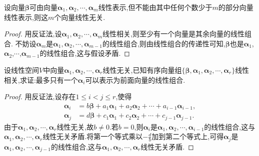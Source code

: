 \documentclass[../../main.tex]{subfiles}%
\begin{document}
\begin{proposition}\label{proposition:线性无关向量组的命题2}
设向量\(\boldsymbol{\beta}\)可由向量\(\boldsymbol{\alpha}_1,\boldsymbol{\alpha}_2,\cdots,\boldsymbol{\alpha}_m\)线性表示,但不能由其中任何个数少于\(m\)的部分向量线性表示,则这\(m\)个向量线性无关.
\end{proposition}
\begin{proof}

用反证法,设\(\boldsymbol{\alpha}_1,\boldsymbol{\alpha}_2,\cdots,\boldsymbol{\alpha}_m\)线性相关,则至少有一个向量是其余向量的线性组合. 不妨设\(\boldsymbol{\alpha}_m\)是\(\boldsymbol{\alpha}_1,\boldsymbol{\alpha}_2,\cdots,\boldsymbol{\alpha}_{m - 1}\)的线性组合,则由线性组合的传递性可知,\(\boldsymbol{\beta}\)也是$\boldsymbol{\alpha}_1$,$\boldsymbol{\alpha}_2$,$\cdots$,$\boldsymbol{\alpha}_{m - 1}$的线性组合,这与假设矛盾. 

\end{proof}

\begin{proposition}\label{proposition:线性无关向量组的命题3}
设线性空间\(V\)中向量\(\boldsymbol{\alpha}_1,\boldsymbol{\alpha}_2,\cdots,\boldsymbol{\alpha}_r\)线性无关,已知有序向量组\(\{\boldsymbol{\beta},\boldsymbol{\alpha}_1,\boldsymbol{\alpha}_2,\cdots,\boldsymbol{\alpha}_r\}\)线性相关,求证:最多只有一个\(\boldsymbol{\alpha}_i\)可以表示为前面向量的线性组合.
\end{proposition}
\begin{proof}

用反证法,设存在\(1\leqslant  i<j\leqslant  r\),使得
\begin{align*}
\boldsymbol{\alpha}_i&=b\boldsymbol{\beta}+a_1\boldsymbol{\alpha}_1 + a_2\boldsymbol{\alpha}_2+\cdots + a_{i - 1}\boldsymbol{\alpha}_{i - 1},\\
\boldsymbol{\alpha}_j&=d\boldsymbol{\beta}+c_1\boldsymbol{\alpha}_1 + c_2\boldsymbol{\alpha}_2+\cdots + c_{j - 1}\boldsymbol{\alpha}_{j - 1}.
\end{align*}
由于\(\boldsymbol{\alpha}_1,\boldsymbol{\alpha}_2,\cdots,\boldsymbol{\alpha}_r\)线性无关,故\(b\neq0\).若$b=0$,则\(\boldsymbol{\alpha}_i\)是\(\boldsymbol{\alpha}_1,\boldsymbol{\alpha}_2,\cdots,\boldsymbol{\alpha}_{i - 1}\)的线性组合,这与\(\boldsymbol{\alpha}_1,\boldsymbol{\alpha}_2,\cdots,\boldsymbol{\alpha}_r\)线性无关矛盾.将第一个等式乘以\(-\frac{d}{b}\)加到第二个等式上,可得\(\boldsymbol{\alpha}_j\)是\(\boldsymbol{\alpha}_1,\boldsymbol{\alpha}_2,\cdots,\boldsymbol{\alpha}_{j - 1}\)的线性组合,这与\(\boldsymbol{\alpha}_1,\boldsymbol{\alpha}_2,\cdots,\boldsymbol{\alpha}_r\)线性无关矛盾.

\end{proof}
\end{document}
